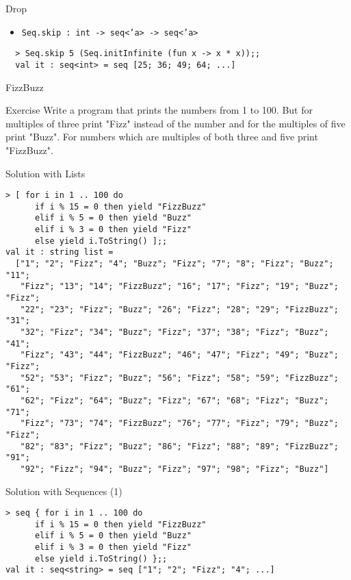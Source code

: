 \documentclass{beamer}
\begin{document}
\begin{frame}[fragile]{Drop}
  \begin{itemize}
    \item \texttt{Seq.skip : int -> seq<'a> -> seq<'a>}
  \end{itemize}
  \begin{verbatim}
  > Seq.skip 5 (Seq.initInfinite (fun x -> x * x));;
  val it : seq<int> = seq [25; 36; 49; 64; ...]
  \end{verbatim}
\end{frame}

\begin{frame}{FizzBuzz}
  \begin{block}{Exercise}
  Write a program that prints the numbers from 1 to 100. But for multiples of
  three print "Fizz" instead of the number and for the multiples of five print
  "Buzz". For numbers which are multiples of both three and five print
  "FizzBuzz".
  \end{block}
\end{frame}

\begin{frame}[fragile]{Solution with Lists}
  \tiny
  \begin{verbatim}
> [ for i in 1 .. 100 do
      if i % 15 = 0 then yield "FizzBuzz"
      elif i % 5 = 0 then yield "Buzz"
      elif i % 3 = 0 then yield "Fizz"
      else yield i.ToString() ];;
val it : string list =
  ["1"; "2"; "Fizz"; "4"; "Buzz"; "Fizz"; "7"; "8"; "Fizz"; "Buzz"; "11";
   "Fizz"; "13"; "14"; "FizzBuzz"; "16"; "17"; "Fizz"; "19"; "Buzz"; "Fizz";
   "22"; "23"; "Fizz"; "Buzz"; "26"; "Fizz"; "28"; "29"; "FizzBuzz"; "31";
   "32"; "Fizz"; "34"; "Buzz"; "Fizz"; "37"; "38"; "Fizz"; "Buzz"; "41";
   "Fizz"; "43"; "44"; "FizzBuzz"; "46"; "47"; "Fizz"; "49"; "Buzz"; "Fizz";
   "52"; "53"; "Fizz"; "Buzz"; "56"; "Fizz"; "58"; "59"; "FizzBuzz"; "61";
   "62"; "Fizz"; "64"; "Buzz"; "Fizz"; "67"; "68"; "Fizz"; "Buzz"; "71";
   "Fizz"; "73"; "74"; "FizzBuzz"; "76"; "77"; "Fizz"; "79"; "Buzz"; "Fizz";
   "82"; "83"; "Fizz"; "Buzz"; "86"; "Fizz"; "88"; "89"; "FizzBuzz"; "91";
   "92"; "Fizz"; "94"; "Buzz"; "Fizz"; "97"; "98"; "Fizz"; "Buzz"]
  \end{verbatim}
\end{frame}

\begin{frame}[fragile]{Solution with Sequences (1)}
  \begin{verbatim}
> seq { for i in 1 .. 100 do
      if i % 15 = 0 then yield "FizzBuzz"
      elif i % 5 = 0 then yield "Buzz"
      elif i % 3 = 0 then yield "Fizz"
      else yield i.ToString() };;
val it : seq<string> = seq ["1"; "2"; "Fizz"; "4"; ...]
  \end{verbatim}
\end{frame}
\end{document}
